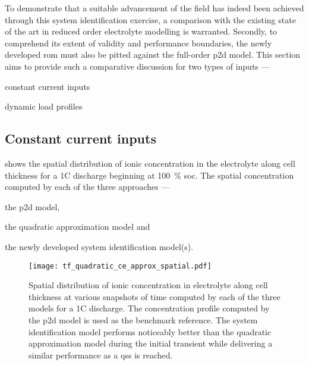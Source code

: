 
To demonstrate that a suitable advancement of the field has indeed been achieved
through  this system  identification exercise,  a comparison  with the  existing
state of the art in reduced  order electrolyte modelling is warranted. Secondly,
to  comprehend its  extent of  validity  and performance  boundaries, the  newly
developed \gls{rom} must also be  pitted against the full-order \gls{p2d} model.
This section  aims to  provide such  a comparative discussion  for two  types of
inputs ---
\begin{enumerate*}[label=\itshape\alph*\upshape)]
    \item constant current inputs
    \item dynamic load profiles
\end{enumerate*}

\subsection{Constant current inputs}

 shows  the spatial distribution  of ionic
concentration  in  the electrolyte  along  cell  thickness  for a  1C  discharge
beginning at \SI{100}{\percent} \gls{soc}. The spatial concentration computed by
each of the three approaches ---
\begin{enumerate*}[label=\roman*)]
    \item the \gls{p2d} model,
    \item the quadratic approximation model and
    \item the newly developed system identification model(s).
\end{enumerate*}

\begin{figure}[!htbp]
    \centering
    \texttt{[image: tf\_quadratic\_ce\_approx\_spatial.pdf]}
    \caption[Spatial distribution of ionic concentration in
    electrolyte for a 1C discharge computed by the , quadratic
    approximation \& system identification models]{%
        Spatial distribution of ionic concentration  in electrolyte along cell
        thickness at various  snapshots of  time computed  by each of  the three
        models for  a 1C discharge.  The concentration  profile  computed by
        the  \gls{p2d} model is used as the benchmark reference. The  system
        identification model performs noticeably better than the quadratic
        approximation model during  the initial  transient  while delivering a
        similar performance as a \gls{qss} is reached.
}%
\label{fig:tfquadp2dspatialionicconc1C}
\end{figure}

